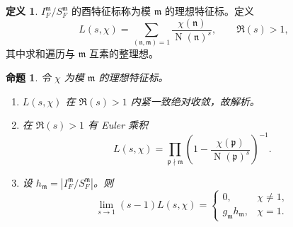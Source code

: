 \documentclass[11pt,a4paper,openany]{ctexbook}
\numberwithin{equation}{chapter}
\newcommand{\Nm}{\operatorname{N}}
\theoremstyle{plain}
\newtheorem{proposition}[theorem]{命题}
\theoremstyle{definition}
\newtheorem{definition}[theorem]{定义}
\theoremstyle{remark}
\begin{document}
\begin{definition}
$I_F^{\mathfrak m}/S_F^{\mathfrak m}$ 的酉特征标称为模 $\mathfrak m$ 的理想特征标。定义
\[
L(s,\chi)=\sum_{(\mathfrak n,\mathfrak m)=1}
\frac{\chi(\mathfrak n)}{\Nm(\mathfrak n)^s},
\qquad \Re(s)>1,
\]
其中求和遍历与 $\mathfrak m$ 互素的整理想。
\end{definition}

\begin{proposition}
令 $\chi$ 为模 $\mathfrak m$ 的理想特征标。
\begin{enumerate}[label=(\arabic*)]
\item $L(s,\chi)$ 在 $\Re(s)>1$ 内紧一致绝对收敛，故解析。
\item 在 $\Re(s)>1$ 有 Euler 乘积
\[
L(s,\chi)=
\prod_{\mathfrak p\nmid\mathfrak m}
\left(1-\frac{\chi(\mathfrak p)}{\Nm(\mathfrak p)^s}\right)^{-1}.
\]
\item 设 $h_{\mathfrak m}=|I_F^{\mathfrak m}/S_F^{\mathfrak m}|$。则
\[
\lim_{s\to1}(s-1)L(s,\chi)
=
\begin{cases}
0,&\chi\ne1,\\
g_{\mathfrak m}h_{\mathfrak m},&\chi=1.
\end{cases}
\]
\end{enumerate}
\end{proposition}
\end{document}

